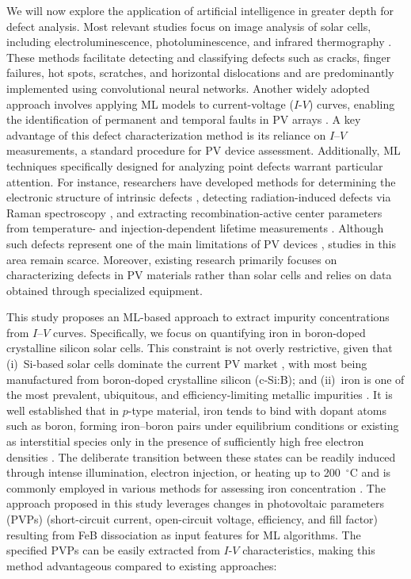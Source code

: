 \documentclass[a4paper,fleqn]{cas-sc}
\begin{document}
We will now explore the application of artificial intelligence in greater depth for defect analysis.
Most relevant studies focus on image analysis of solar cells, including electroluminescence, photoluminescence,
and infrared thermography \cite{AlOtum2024, Pratt2021, Li2024a, Lin2021, Tang2020, Bu2022, Turek2023, Huang2022}.
These methods facilitate detecting and classifying defects such as cracks, finger failures, hot spots, scratches,
and horizontal dislocations and are predominantly implemented using convolutional neural networks.
Another widely adopted approach involves applying ML models to current-voltage ($I$-$V$) curves,
enabling the identification of permanent and temporal faults in PV arrays \cite{Liu2021, Chen2019, Hopwood2020, Mellit2021}.
A key advantage of this defect characterization method is its reliance on $I$–$V$ measurements,
a standard procedure for PV device assessment.
Additionally, ML techniques specifically designed for analyzing point defects warrant particular attention.
For instance, researchers have developed methods for determining
the electronic structure of intrinsic defects \cite{Ma2025, Choudhary2023},
detecting radiation-induced defects via Raman spectroscopy \cite{Chia2024, Park2022},
and extracting recombination-active center parameters from temperature- and injection-dependent
lifetime measurements \cite{Wang2024a, Buratti2022, Buratti2020a}.
Although such defects represent one of the main limitations of PV devices \cite{Le2024, Yamaguchi2018}, studies in this area remain scarce.
Moreover, existing research primarily focuses on characterizing defects in PV materials rather than solar cells and relies on data obtained through specialized equipment.

This study proposes an ML-based approach to extract impurity concentrations from $I$–$V$ curves.
Specifically, we focus on quantifying iron in boron-doped crystalline silicon solar cells.
This constraint is not overly restrictive, given that
(i)~Si-based solar cells dominate the current PV market \cite{Bosnjakovic2024, Zhang2021},
with most being manufactured from boron-doped crystalline silicon (c-Si:B);
and (ii)~iron is one of the most prevalent, ubiquitous, and efficiency-limiting metallic impurities \cite{Buonassisi2006, IronSC}.
It is well established that in $p$-type material,
iron tends to bind with dopant atoms such as boron, forming iron–boron pairs under equilibrium conditions
or existing as interstitial species only in the presence of sufficiently high free electron densities \cite{Kimerling1983, FeBAssJAP2014}.
The deliberate transition between these states can be readily induced
through intense illumination, electron injection, or heating up to 200~$^\circ$C and
is commonly employed in various methods for assessing iron concentration
\cite{Zoth1990, Rein2, Schmidt2005, Goodarzi2017, Olikh2021JAP, FeMethod2012, Herguth2022, Macdonald2004}.
The approach proposed in this study leverages changes in photovoltaic parameters (PVPs)
(short-circuit current, open-circuit voltage, efficiency, and fill factor) resulting from FeB dissociation as input features for ML algorithms.
The specified PVPs can be easily extracted from $I$-$V$ characteristics, making this method advantageous compared to existing approaches:
\end{document}

